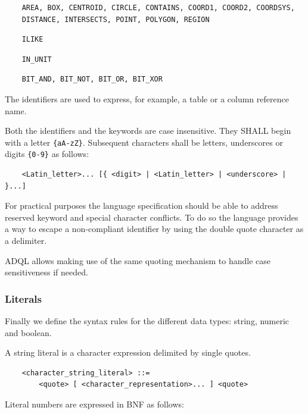 \documentclass[11pt,a4paper]{ivoa}
\begin{document}
\begin{verbatim}
    AREA, BOX, CENTROID, CIRCLE, CONTAINS, COORD1, COORD2, COORDSYS,
    DISTANCE, INTERSECTS, POINT, POLYGON, REGION
\end{verbatim}

\begin{verbatim}
    ILIKE
\end{verbatim}

\begin{verbatim}
    IN_UNIT
\end{verbatim}

\begin{verbatim}
    BIT_AND, BIT_NOT, BIT_OR, BIT_XOR
\end{verbatim}


The identifiers are used to express, for example, a table or a column
reference name.

Both the identifiers and the keywords are case insensitive. They SHALL
begin with a letter \verb:{aA-zZ}:. Subsequent characters shall be letters,
underscores or digits \verb:{0-9}: as follows:

\begin{verbatim}
    <Latin_letter>... [{ <digit> | <Latin_letter> | <underscore> | }...]
\end{verbatim}

For practical purposes the language specification should be able to address
reserved keyword and special character conflicts. To do so the language
provides a way to escape a non-compliant identifier by using the double
quote character as a delimiter.

ADQL allows making use of the same quoting mechanism to handle case
sensitiveness if needed.

\subsubsection{Literals}
\label{sec:literals}

Finally we define the syntax rules for the different data types: string,
numeric and boolean.

A string literal is a character expression delimited by single quotes.

\begin{verbatim}
    <character_string_literal> ::=
        <quote> [ <character_representation>... ] <quote>
\end{verbatim}

Literal numbers are expressed in BNF as follows:
\end{document}
